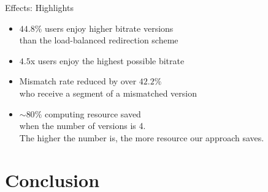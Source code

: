 \documentclass{beamer}
\begin{document}
\begin{frame}{Effects: Highlights}
	\begin{itemize}
		\item<1> $44.8\%$  users enjoy higher bitrate versions\\
		than the load-balanced redirection scheme
		\item<1> $4.5$x users enjoy the highest possible bitrate\\
		\item<1> Mismatch rate reduced by over $42.2\%$\\
		who receive a segment of a mismatched version
		\item<1> $\sim 80\%$ computing resource saved\\
		when the number of versions is 4. \\
		The higher the number is, the more resource our approach saves. 
	\end{itemize}
\end{frame}

\section{Conclusion}

%
\end{document}
